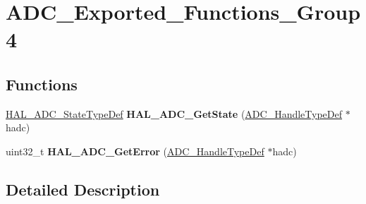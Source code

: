 \hypertarget{group___a_d_c___exported___functions___group4}{}\section{A\+D\+C\+\_\+\+Exported\+\_\+\+Functions\+\_\+\+Group4}
\label{group___a_d_c___exported___functions___group4}
\subsection*{Functions}
\begin{DoxyCompactItemize}
\item 
\hyperlink{group___a_d_c___exported___types_gafd66db22d830742b403c1f7f32d4630e}{H\+A\+L\+\_\+\+A\+D\+C\+\_\+\+State\+Type\+Def} {\bfseries H\+A\+L\+\_\+\+A\+D\+C\+\_\+\+Get\+State} (\hyperlink{struct_a_d_c___handle_type_def}{A\+D\+C\+\_\+\+Handle\+Type\+Def} $\ast$hadc)\hypertarget{group___a_d_c___exported___functions___group4_gab890563da42bb22b95755506869dd452}{}\label{group___a_d_c___exported___functions___group4_gab890563da42bb22b95755506869dd452}

\item 
uint32\+\_\+t {\bfseries H\+A\+L\+\_\+\+A\+D\+C\+\_\+\+Get\+Error} (\hyperlink{struct_a_d_c___handle_type_def}{A\+D\+C\+\_\+\+Handle\+Type\+Def} $\ast$hadc)\hypertarget{group___a_d_c___exported___functions___group4_ga3a546afb96f473f266573783f37ee8af}{}\label{group___a_d_c___exported___functions___group4_ga3a546afb96f473f266573783f37ee8af}

\end{DoxyCompactItemize}


\subsection{Detailed Description}

